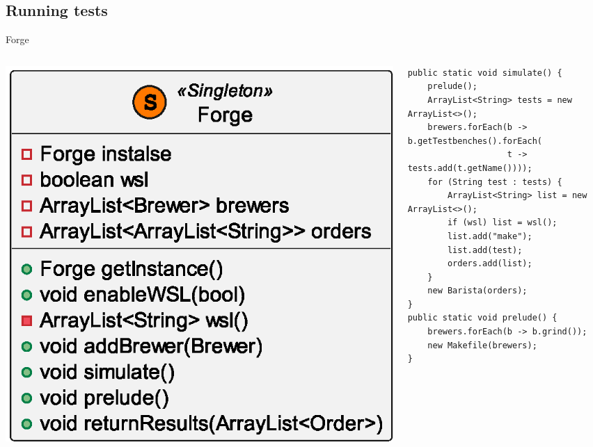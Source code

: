 \documentclass[aspectratio=169, handout]{beamer}
\begin{document}
\subsection{Running tests}
\begin{frame}[containsverbatim]{Forge}
    \begin{columns}[T]
        \begin{column}{.2\textwidth}
            \includegraphics[width=\columnwidth]{out/plantuml/ForgeClass/ForgeClass.eps}
        \end{column}
        \begin{column}{.8\textwidth}
            \begin{verbatim}
public static void simulate() {
    prelude();
    ArrayList<String> tests = new ArrayList<>();
    brewers.forEach(b -> b.getTestbenches().forEach(
                    t -> tests.add(t.getName())));
    for (String test : tests) {
        ArrayList<String> list = new ArrayList<>();
        if (wsl) list = wsl();
        list.add("make");
        list.add(test);
        orders.add(list);
    }
    new Barista(orders);
}
public static void prelude() {
    brewers.forEach(b -> b.grind());
    new Makefile(brewers);
}
            \end{verbatim}
        \end{column}
    \end{columns}
\end{frame}
\end{document}
